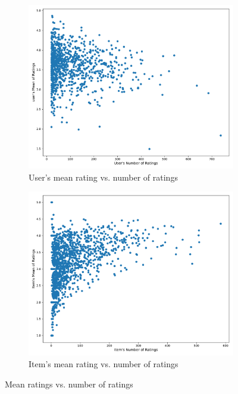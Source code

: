 \begin{figure}[htbp]
\centering
\begin{subfigure}[b]{0.5\linewidth}
  \includegraphics[width=1.00\textwidth]{./figures/user_mean_rating.pdf}
  \caption{User's mean rating vs. number of ratings}
   \label{ex_without_source}
\end{subfigure}%
\begin{subfigure}[b]{0.5\linewidth}
  \centering
  \includegraphics[width=1.00\textwidth]{./figures/item_mean_rating.pdf}
  \caption{Item's mean rating vs. number of ratings}
  \label{ex_with_source}
\end{subfigure}%
\raggedright
\caption{Mean ratings vs. number of ratings}
\label{fig:source_injection}
\end{figure}

